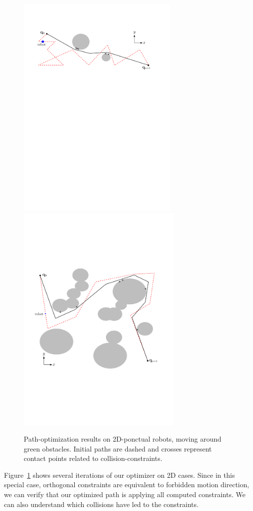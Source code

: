 \documentclass{tADR2e}
\begin{document}
\begin{figure}[t]
	\centering
	\includegraphics[width=7.8cm]{contact_points6.pdf}
	\includegraphics[width=8cm]{contact_points2potential.pdf}
	\caption{Path-optimization results on 2D-ponctual robots, moving around 
	green obstacles. Initial paths are dashed and crosses represent contact points 
	related to collision-constraints.}
	\label{2D_long}
\end{figure}

Figure~\ref{2D_long} shows several iterations of our optimizer on 2D cases. Since 
in this special case, orthogonal constraints are equivalent to forbidden motion 
direction, we can verify that our optimized path is applying 
all computed constraints. We can also understand which collisions have led to 
the constraints.
\end{document}
